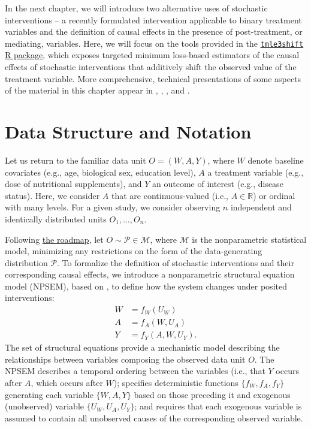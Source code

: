 \documentclass[
  12pt, krantz2,
]{krantz}
\newcommand{\passthrough}[1]{#1}
\theoremstyle{definition}
\theoremstyle{definition}
\theoremstyle{definition}
\newcommand{\R}{\mathbb{R}}
\newcommand{\M}{\mathcal{M}}
\newcommand{\1}{\mathbbm{1}}
\begin{document}
In the next chapter, we will introduce two alternative uses of stochastic
interventions -- a recently formulated intervention applicable to binary
treatment variables \citep{kennedy2019nonparametric} and the definition of causal
effects in the presence of post-treatment, or mediating, variables. Here, we
will focus on the tools provided in the \href{https://github.com/tlverse/tmle3shift}{\passthrough{\lstinline!tmle3shift!} R
package}, which exposes targeted minimum
loss-based estimators of the causal effects of stochastic interventions that
additively shift the observed value of the treatment variable. More
comprehensive, technical presentations of some aspects of the material in this
chapter appear in \citet{diaz2012population}, \citet{diaz2018stochastic},
\citet{hejazi2020efficient}, and \citet{hejazi2021semiparametric}.

\hypertarget{data-structure-and-notation-1}{%
\section{Data Structure and Notation}\label{data-structure-and-notation-1}}

Let us return to the familiar data unit \(O = (W, A, Y)\), where \(W\) denote
baseline covariates (e.g., age, biological sex, education level), \(A\) a
treatment variable (e.g., dose of nutritional supplements), and \(Y\) an outcome
of interest (e.g., disease status). Here, we consider \(A\) that are
continuous-valued (i.e., \(A \in \R\)) or ordinal with many levels. For a given
study, we consider observing \(n\) independent and identically distributed units
\(O_1, \ldots, O_n\).

Following \protect\hyperlink{roadmap}{the roadmap}, let \(O \sim \mathcal{P} \in \M\), where \(\M\)
is the nonparametric statistical model, minimizing any restrictions on the form
of the data-generating distribution \(\mathcal{P}\). To formalize the definition
of stochastic interventions and their corresponding causal effects, we introduce
a nonparametric structural equation model (NPSEM), based on \citet{pearl2009causality},
to define how the system changes under posited interventions:
\begin{align}
  W &= f_W(U_W) \\ A &= f_A(W, U_A) \\ Y &= f_Y(A, W, U_Y).
  \label{eq:npsem-shift}
\end{align}
The set of structural equations provide a mechanistic model describing the
relationships between variables composing the observed data unit \(O\). The NPSEM
describes a temporal ordering between the variables (i.e., that \(Y\) occurs after
\(A\), which occurs after \(W\)); specifies deterministic functions \(\{f_W, f_A, f_Y\}\) generating each variable \(\{W, A, Y\}\) based on those preceding it and
exogenous (unobserved) variable \(\{U_W, U_A, U_Y\}\); and requires that each
exogenous variable is assumed to contain all unobserved causes of the
corresponding observed variable.
\end{document}
